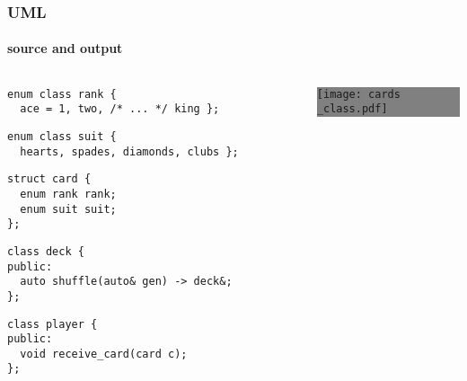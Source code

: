\documentclass[compress,table,xcolor=table]{beamer}
\begin{document}
\begin{frame}[fragile]
  \frametitle{UML}
  \framesubtitle{source and output}
  \begin{columns}
    \begin{column}{.72\textwidth}
    \begin{lstlisting}[language=c++2x,basicstyle=\scriptsize\ttfamily]
enum class rank {
  ace = 1, two, /* ... */ king };
    \end{lstlisting}
    \begin{lstlisting}[language=c++2x,basicstyle=\scriptsize\ttfamily]
enum class suit {
  hearts, spades, diamonds, clubs };
    \end{lstlisting}
    \begin{lstlisting}[language=c++2x,basicstyle=\scriptsize\ttfamily]
struct card {
  enum rank rank;
  enum suit suit;
};
    \end{lstlisting}
    \begin{lstlisting}[language=c++2x,basicstyle=\scriptsize\ttfamily]
class deck {
public:
  auto shuffle(auto& gen) -> deck&;
};
    \end{lstlisting}
    \begin{lstlisting}[language=c++2x,basicstyle=\scriptsize\ttfamily]
class player {
public:
  void receive_card(card c);
};
    \end{lstlisting}
    \end{column}
    \begin{column}{.27\textwidth}
      \colorbox{gray}{
        \begin{minipage}{\dimexpr\textwidth\relax}
        \centering
        \texttt{[image: cards\\\_class.pdf]}
        \end{minipage}
      }
    \end{column}
  \end{columns}
\end{frame}
\end{document}
